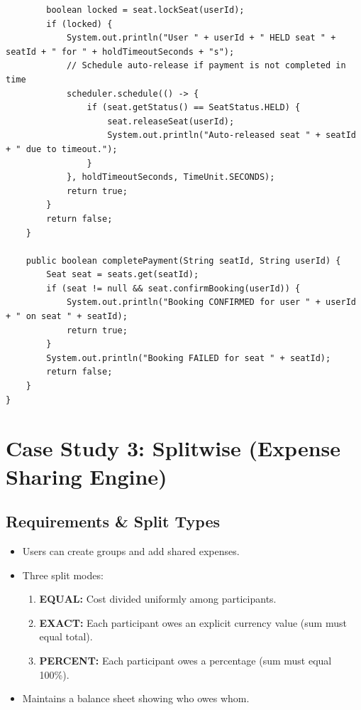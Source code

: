 \documentclass[10pt,journal,compsoc,onecolumn]{IEEEtran}
\begin{document}
\begin{verbatim}
        boolean locked = seat.lockSeat(userId);
        if (locked) {
            System.out.println("User " + userId + " HELD seat " + seatId + " for " + holdTimeoutSeconds + "s");
            // Schedule auto-release if payment is not completed in time
            scheduler.schedule(() -> {
                if (seat.getStatus() == SeatStatus.HELD) {
                    seat.releaseSeat(userId);
                    System.out.println("Auto-released seat " + seatId + " due to timeout.");
                }
            }, holdTimeoutSeconds, TimeUnit.SECONDS);
            return true;
        }
        return false;
    }

    public boolean completePayment(String seatId, String userId) {
        Seat seat = seats.get(seatId);
        if (seat != null && seat.confirmBooking(userId)) {
            System.out.println("Booking CONFIRMED for user " + userId + " on seat " + seatId);
            return true;
        }
        System.out.println("Booking FAILED for seat " + seatId);
        return false;
    }
}
\end{verbatim}

\section{Case Study 3: Splitwise (Expense Sharing Engine)}
\label{sec:splitwise}

\subsection{Requirements \& Split Types}
\begin{itemize}
    \item Users can create groups and add shared expenses.
    \item Three split modes:
    \begin{enumerate}
        \item \textbf{EQUAL:} Cost divided uniformly among participants.
        \item \textbf{EXACT:} Each participant owes an explicit currency value (sum must equal total).
        \item \textbf{PERCENT:} Each participant owes a percentage (sum must equal 100\%).
    \end{enumerate}
    \item Maintains a balance sheet showing who owes whom.
\end{itemize}
\end{document}
